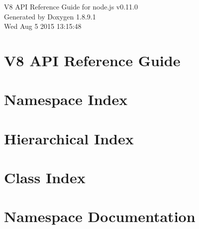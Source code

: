 \documentclass[twoside]{book}
\newcommand{\+}{\discretionary{\mbox{\scriptsize$\hookleftarrow$}}{}{}}
\newcommand{\clearemptydoublepage}{%
  \newpage{\pagestyle{empty}\cleardoublepage}%
}
\begin{document}
\hypersetup{pageanchor=false,
             bookmarks=true,
             bookmarksnumbered=true,
             pdfencoding=unicode
            }
\begin{titlepage}
\vspace*{7cm}
\begin{center}%
{\Large V8 A\+P\+I Reference Guide for node.\+js v0.11.0 }\\
\vspace*{1cm}
{\large Generated by Doxygen 1.8.9.1}\\
\vspace*{0.5cm}
{\small Wed Aug 5 2015 13:15:48}\\
\end{center}
\end{titlepage}
\clearemptydoublepage
\tableofcontents
\clearemptydoublepage
{}
\hypersetup{pageanchor=true}

\chapter{V8 A\+P\+I Reference Guide}
\label{index}\hypertarget{index}{}
\chapter{Namespace Index}

\chapter{Hierarchical Index}

\chapter{Class Index}

\chapter{Namespace Documentation}

\end{document}
